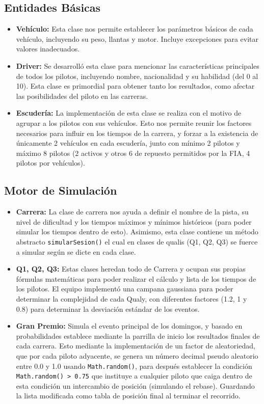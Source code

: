 \documentclass[12pt,a4paper]{article}
\begin{document}
\subsection{Entidades Básicas}
\begin{itemize}
    \item \textbf{Vehículo:} Esta clase nos permite establecer los parámetros básicos de cada vehículo, incluyendo su peso, llantas y motor. Incluye excepciones para evitar valores inadecuados.
    \item \textbf{Driver:} Se desarrolló esta clase para mencionar las características principales de todos los pilotos, incluyendo nombre, nacionalidad y su habilidad (del 0 al 10). Esta clase es primordial para obtener tanto los resultados, como afectar las posibilidades del piloto en las carreras.
    \item \textbf{Escudería:} La implementación de esta clase se realiza con el motivo de agrupar a los pilotos con sus vehículos. Esto nos permite reunir los factores necesarios para influir en los tiempos de la carrera, y forzar a la existencia de únicamente 2 vehículos en cada escudería, junto con mínimo 2 pilotos y máximo 8 pilotos (2 activos y otros 6 de repuesto permitidos por la FIA, 4 pilotos por vehículos).
\end{itemize}

\subsection{Motor de Simulación}
\begin{itemize}
    \item \textbf{Carrera:} La clase de carrera nos ayuda a definir el nombre de la pista, su nivel de dificultad y los tiempos máximos y mínimos históricos (para poder simular los tiempos dentro de esto). Asimismo, esta clase contiene un método abstracto \texttt{simularSesion()} el cual en clases de qualis (Q1, Q2, Q3) se fuerce a simular según se dicte en cada clase.
    \item \textbf{Q1, Q2, Q3:} Estas clases heredan todo de Carrera y ocupan sus propias fórmulas matemáticas para poder realizar el cálculo y lista de los tiempos de los pilotos. El equipo implementó una campana gaussiana para poder determinar la complejidad de cada Qualy, con diferentes factores (1.2, 1 y 0.8) para determinar la desviación estándar de los eventos.
    \item \textbf{Gran Premio:} Simula el evento principal de los domingos, y basado en probabilidades establece mediante la parrilla de inicio los resultados finales de cada carrera. Esto mediante la implementación de un factor de aleatoriedad, que por cada piloto adyacente, se genera un número decimal pseudo aleatorio entre 0.0 y 1.0 usando \texttt{Math.random()}, para después establecer la condición \texttt{Math.random() > 0.75} que instituye a cualquier piloto que caiga dentro de esta condición un intercambio de posición (simulando el rebase). Guardando la lista modificada como tabla de posición final al terminar el recorrido.
\end{itemize}
\end{document}

